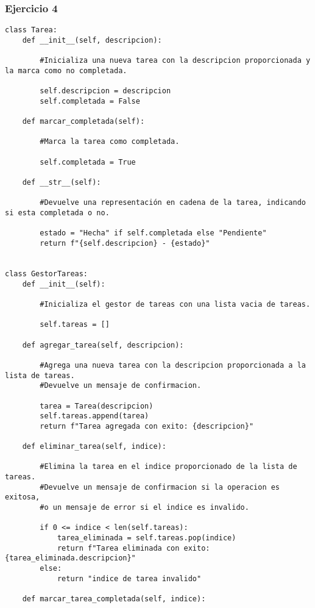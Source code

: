 \documentclass[10pt,a4paper]{article}
\begin{document}
\subsubsection{Ejercicio 4}
\begin{lstlisting}
class Tarea:
    def __init__(self, descripcion):
    
        #Inicializa una nueva tarea con la descripcion proporcionada y la marca como no completada.
        
        self.descripcion = descripcion
        self.completada = False

    def marcar_completada(self):
        
        #Marca la tarea como completada.
        
        self.completada = True

    def __str__(self):
        
        #Devuelve una representación en cadena de la tarea, indicando si esta completada o no.
        
        estado = "Hecha" if self.completada else "Pendiente"
        return f"{self.descripcion} - {estado}"


class GestorTareas:
    def __init__(self):
        
        #Inicializa el gestor de tareas con una lista vacia de tareas.
        
        self.tareas = []

    def agregar_tarea(self, descripcion):
        
        #Agrega una nueva tarea con la descripcion proporcionada a la lista de tareas.
        #Devuelve un mensaje de confirmacion.
    
        tarea = Tarea(descripcion)
        self.tareas.append(tarea)
        return f"Tarea agregada con exito: {descripcion}"

    def eliminar_tarea(self, indice):
        
        #Elimina la tarea en el indice proporcionado de la lista de tareas.
        #Devuelve un mensaje de confirmacion si la operacion es exitosa,
        #o un mensaje de error si el indice es invalido.
        
        if 0 <= indice < len(self.tareas):
            tarea_eliminada = self.tareas.pop(indice)
            return f"Tarea eliminada con exito: {tarea_eliminada.descripcion}"
        else:
            return "indice de tarea invalido"

    def marcar_tarea_completada(self, indice):
        

\end{lstlisting}
\end{document}
